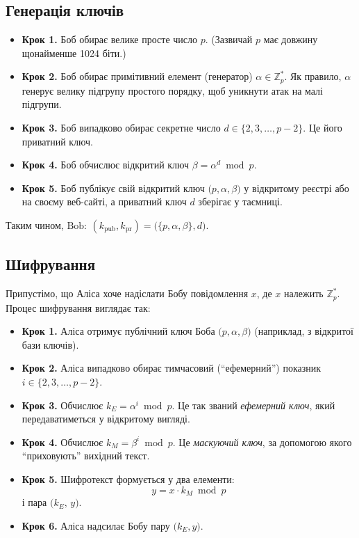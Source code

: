 \documentclass[12pt]{report}
\theoremstyle{definition}
\theoremstyle{plain}
\begin{document}
\subsection{Генерація ключів}

\begin{itemize}
    \item \textbf{Крок 1.} Боб обирає велике просте число \(p\). 
          (Зазвичай \(p\) має довжину щонайменше 1024 біти.)
    \item \textbf{Крок 2.} Боб обирає примітивний елемент (генератор) \(\alpha \in \mathbb{Z}_p^*\). 
          Як правило, \(\alpha\) генерує велику підгрупу простого порядку, щоб уникнути атак 
          на малі підгрупи.
    \item \textbf{Крок 3.} Боб випадково обирає секретне число 
          \(d \in \{2, 3, \dots, p - 2\}\). Це його приватний ключ.
    \item \textbf{Крок 4.} Боб обчислює відкритий ключ 
          \(\beta = \alpha^d \bmod p\).
    \item \textbf{Крок 5.} Боб публікує свій відкритий ключ \(\bigl(p, \alpha, \beta\bigr)\) у відкритому реєстрі 
          або на своєму веб-сайті, а приватний ключ \(d\) зберігає у таємниці.
\end{itemize}

Таким чином, \(\text{Bob}:\ (k_{\text{pub}}, k_{\text{pr}}) = \bigl(\{p, \alpha, \beta\}, d\bigr)\).

\subsection{Шифрування}

Припустімо, що Аліса хоче надіслати Бобу повідомлення \(x\), де \(x\) належить 
\(\mathbb{Z}_p^*\). Процес шифрування виглядає так:

\begin{itemize}
    \item \textbf{Крок 1.} Аліса отримує публічний ключ Боба \(\bigl(p, \alpha, \beta\bigr)\) 
          (наприклад, з відкритої бази ключів).
    \item \textbf{Крок 2.} Аліса випадково обирає тимчасовий (``ефемерний'') показник 
          \(i \in \{2, 3, \dots, p - 2\}\).
    \item \textbf{Крок 3.} Обчислює \(\displaystyle k_E = \alpha^i \bmod p\). 
          Це так званий \textit{ефемерний ключ}, який передаватиметься у відкритому вигляді.
    \item \textbf{Крок 4.} Обчислює \(\displaystyle k_M = \beta^i \bmod p\). 
          Це \textit{маскуючий ключ}, за допомогою якого ``приховують'' вихідний текст.
    \item \textbf{Крок 5.} Шифротекст формується у два елементи:
          \[
              y = x \cdot k_M \bmod p
          \]
          і пара \(\bigl(k_E,\, y\bigr)\).
    \item \textbf{Крок 6.} Аліса надсилає Бобу пару \(\bigl(k_E, y\bigr)\).
\end{itemize}
\end{document}
